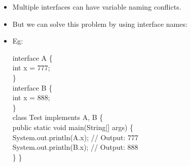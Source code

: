 \setlength{\columnsep}{3pt}
\begin{flushleft}
	
	\begin{itemize}
		\item Multiple interfaces can have variable naming conflicts. 
		\item But we can solve this problem by using interface names:
		\item Eg:
		
		 {
		interface A \{ \\
		\s int x = 777; \\
		\} \\
		interface B \{ \\
		\s int x = 888; \\
		\} \\
		class Test implements A, B \{ \\
		\s public static void main(String[] args) \{ \\
		\s \s		System.out.println(A.x); // Output: 777 \\
		\s \s		System.out.println(B.x); // Output: 888 \\
		\s	\} \}
		}
	\end{itemize}
	
	
\end{flushleft}
\newpage

